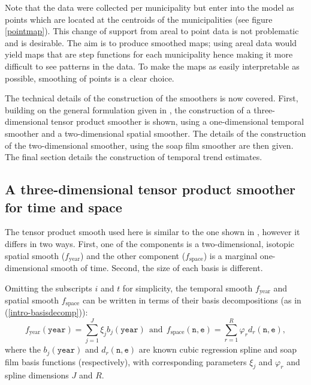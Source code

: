 Note that the data were collected per municipality but enter into the model as points which are located at the centroids of the municipalities (see figure \ref{pointmap}). This change of support from areal to point data is not problematic and is desirable. The aim is to produce smoothed maps; using areal data would yield maps that are step functions for each municipality hence making it more difficult to see patterns in the data. To make the maps as easily interpretable as possible, smoothing of points is a clear choice.

The technical details of the construction of the smoothers is now covered. First, building on the general formulation given in , the construction of a three-dimensional tensor product smoother is shown, using a one-dimensional temporal smoother and a two-dimensional spatial smoother. The details of the construction of the two-dimensional smoother, using the soap film smoother are then given. The final section details the construction of temporal trend estimates.

\subsection{A three-dimensional tensor product smoother for time and space \label{3D}}

The tensor product smooth used here is similar to the one shown in , however it differs in two ways.  First, one of the components is a two-dimensional, isotopic spatial smooth ($f_\text{year}$) and the other component ($f_\text{space}$) is a marginal one-dimensional smooth of time. Second, the size of each basis is different.

Omitting the subscripts $i$ and $t$ for simplicity, the temporal smooth $f_\text{year}$ and spatial smooth $f_\text{space}$ can be written in terms of their basis decompositions (as in (\ref{intro-basisdecomp})):
\begin{equation*}
f_\text{year}(\texttt{year})=\sum_{j=1}^J \xi_j b_j(\texttt{year}) \ \ \text{and} \ \ f_\text{space}(\texttt{n},\texttt{e})=\sum_{r=1}^R \varphi_r d_r(\texttt{n},\texttt{e}),
\end{equation*}
where the $b_j(\texttt{year})$ and $d_r(\texttt{n},\texttt{e})$ are known cubic regression spline and soap film basis functions (respectively), with corresponding parameters $\xi_j$ and $\varphi_r$ and spline dimensions $J$ and $R$. 

